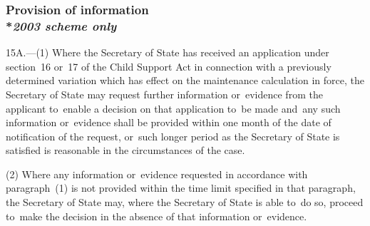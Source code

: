\documentclass[12pt,a4paper]{article}
\begin{document}
\subsubsection[15A. Provision of information]{Provision of information\\*\emph{2003 scheme only}}

15A.---(1)  Where the 
Secretary of State  %
has received an application under section~16 or~17 of the Child Support Act in connection with a previously determined variation which has effect on the maintenance calculation in force, 
the Secretary of State  %
may request further information or~evidence from the applicant to~enable a decision on that application to~be made and~any such information or~evidence shall be provided within one month of the date of notification of the request, or~such longer period as the 
Secretary of State  %
is satisfied is reasonable in the circumstances of the case.

(2) Where any information or~evidence requested in accordance with paragraph~(1) is not provided within the time limit specified in that paragraph, the 
Secretary of State  %
may, where 
the Secretary of State  %
is able to~do so, proceed to~make the decision in the absence of that information or~evidence.

\end{document}
